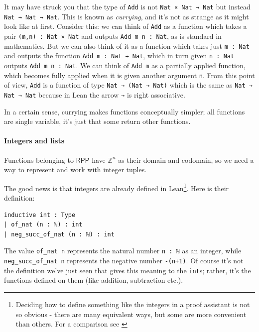 \documentclass[oneside]{book}
\theoremstyle{definition}
\theoremstyle{remark}
\theoremstyle{plain}
\newcommand{\ZZ}{\mathbb{Z}}
\newcommand{\RPP}{\mathsf{RPP}}
\begin{document}
It may have struck you that the type of \lstinline{Add} is not \lstinline{Nat × Nat → Nat}
but instead \lstinline{Nat → Nat → Nat}.
This is known as \textit{currying}, and it's not as strange as it might look like at first.
Consider this: we can think of \lstinline{Add} as a function which takes a pair \lstinline{(m,n) : Nat × Nat} and outputs \lstinline{Add m n : Nat},
as is standard in mathematics.
But we can also think of it as a function which takes just \lstinline{m : Nat} and outputs the function \lstinline{Add m : Nat → Nat},
which in turn given \lstinline{n : Nat} outputs \lstinline{Add m n : Nat}.
We can think of \lstinline{Add m} as a partially applied function, which becomes fully applied when it is given another argument \lstinline{n}.
From this point of view, \lstinline{Add} is a function of type \lstinline{Nat → (Nat → Nat)} which is the same as
\lstinline{Nat → Nat → Nat} because in Lean the arrow \lstinline{→} is right associative.

In a certain sense, currying makes functions conceptually simpler;
all functions are single variable, it's just that some return other functions.

\paragraph{Integers and lists}
Functions belonging to $\RPP$ have $\ZZ^n$ as their domain and codomain,
so we need a way to represent and work with integer tuples.

The good news is that integers are already defined in Lean\footnote{Deciding how to define something like the integers in
a proof assistant is not so obvious - there are many equivalent ways,
but some are more convenient than others. For a comparison see \cite{ints}}.
Here is their definition:
\begin{lstlisting}
inductive int : Type
| of_nat (n : ℕ) : int
| neg_succ_of_nat (n : ℕ) : int  
\end{lstlisting}
The value \lstinline{of_nat n} represents the natural number \lstinline{n : ℕ} as an integer,
while \lstinline{neg_succ_of_nat n} represents the negative number \lstinline{-(n+1)}.
Of course it's not the definition we've just seen that gives this meaning to the \lstinline{int}s;
rather, it's the functions defined on them (like addition, subtraction etc.).
\end{document}
